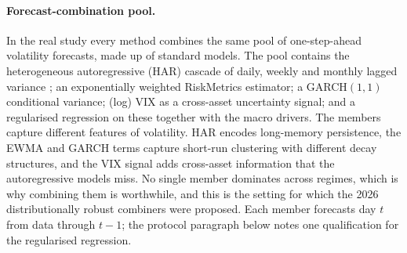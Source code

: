 \documentclass[11pt]{article}
\theoremstyle{plain}
\theoremstyle{remark}
\begin{document}
\paragraph{Forecast-combination pool.}
In the real study every method combines the same pool of one-step-ahead volatility
forecasts, made up of standard models. The pool contains the heterogeneous
autoregressive (HAR) cascade of daily, weekly and monthly lagged variance
\citep{corsi2009har}; an exponentially weighted RiskMetrics estimator; a GARCH$(1,1)$
conditional variance; (log) VIX as a cross-asset uncertainty signal; and a regularised
regression on these together with the macro drivers. The members capture different
features of volatility. HAR encodes long-memory persistence, the EWMA and GARCH terms
capture short-run clustering with different decay structures, and the VIX signal adds
cross-asset information that the autoregressive models miss. No single member
dominates across regimes, which is why combining them is worthwhile, and this is the
setting for which the 2026 distributionally robust combiners were proposed. Each member forecasts day $t$ from data through $t-1$; the protocol paragraph below notes one qualification for the regularised regression.
\end{document}
